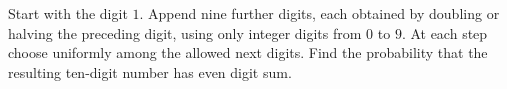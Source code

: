 Start with the digit $1$. Append nine further digits, each obtained by doubling or halving the preceding digit, using only integer digits from $0$ to $9$. At each step choose uniformly among the allowed next digits. Find the probability that the resulting ten-digit number has even digit sum.
